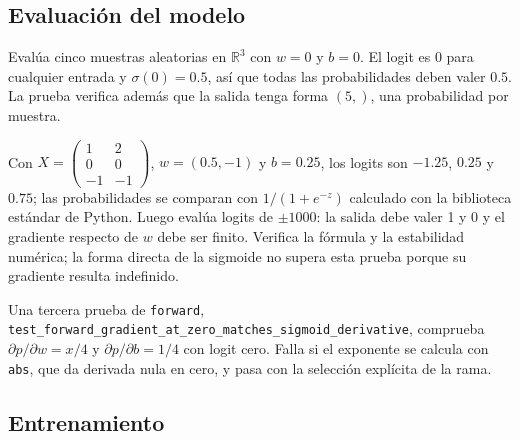 \subsection{Evaluación del modelo}

\begin{description}[style=nextline]
    \item[\texttt{test\_forward\_zero\_parameters\_returns\_one\_half}] Evalúa
    cinco muestras aleatorias en $\mathbb{R}^3$ con $w=0$ y $b=0$. El logit
    es 0 para cualquier entrada y $\sigma(0)=0.5$, así que todas las
    probabilidades deben valer $0.5$. La prueba verifica además que la salida
    tenga forma $(5,)$, una probabilidad por muestra.
    \item[\texttt{test\_forward\_matches\_sigmoid\_and\_is\_stable}] Con
    $X=\begin{pmatrix}1&2\\0&0\\-1&-1\end{pmatrix}$, $w=(0.5,-1)$ y
    $b=0.25$, los logits son $-1.25$, $0.25$ y $0.75$; las probabilidades
    se comparan con $1/(1+e^{-z})$ calculado con la biblioteca estándar de
    Python. Luego evalúa logits de $\pm1000$: la salida debe valer 1 y 0 y
    el gradiente respecto de $w$ debe ser finito. Verifica la fórmula y la
    estabilidad numérica; la forma directa de la sigmoide no supera esta
    prueba porque su gradiente resulta indefinido.
\end{description}

Una tercera prueba de \texttt{forward},
\texttt{test\_forward\_gradient\_at\_zero\_matches\_sigmoid\_derivative},
comprueba $\partial p/\partial w=x/4$ y $\partial p/\partial b=1/4$ con
logit cero. Falla si el exponente se calcula con \texttt{abs}, que da
derivada nula en cero, y pasa con la selección explícita de la rama.

\subsection{Entrenamiento}

